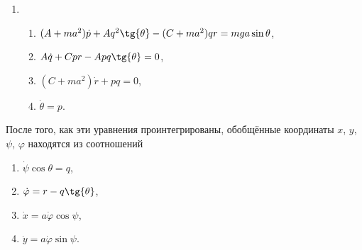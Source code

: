 \begin{enumerate}
$L = \frac{1}{2}m\left( \dot{x}^2 + \dot{y}^2 +
a^2(\dot{\theta}^2 + \dot{\psi}^2\sin^2{\theta}) +
2a\dot{x}(\dot{\theta}\cos{\theta}\sin{\psi}+\dot{\psi}\sin{\theta}\cos{\psi}) -
2a\dot{y}(\dot{\theta}\cos{\theta}\cos{\psi}-\dot{\psi}\sin{\theta}\sin{\psi}) +
\right) + \frac{1}{2}A(\dot{\theta}^2 + \dot{\psi}^2\cos^2{\theta}) +
\frac{1}{2}C(\dot{\psi}\sin{\theta} + \dot{\varphi})^2 -
mga\cos{\theta}$;
\item \begin{enumerate}
\item $(A + ma^2)\dot{p} + Aq^2\tg{\theta} -
(C + ma^2)qr = mga\sin{\theta}$,
\item$A\dot{q} + Cpr - Apq\tg{\theta} = 0$,
\item$(C + ma^2)\dot{r} + pq = 0$,
\item$\dot{\theta} = p$.
\end{enumerate}
\end{enumerate}
После того, как эти уравнения проинтегрированы, обобщённые координаты
$x$, $y$, $\psi$, $\varphi$ находятся из соотношений
\begin{enumerate}
\item $\dot{\psi}\cos{\theta} = q$,
\item $\dot{\varphi} = r -q\tg{\theta}$,
\item $\dot{x} = a\dot{\varphi}\cos{\psi}$,
\item $\dot{y} = a\dot{\varphi}\sin{\psi}$.
\end{enumerate}
